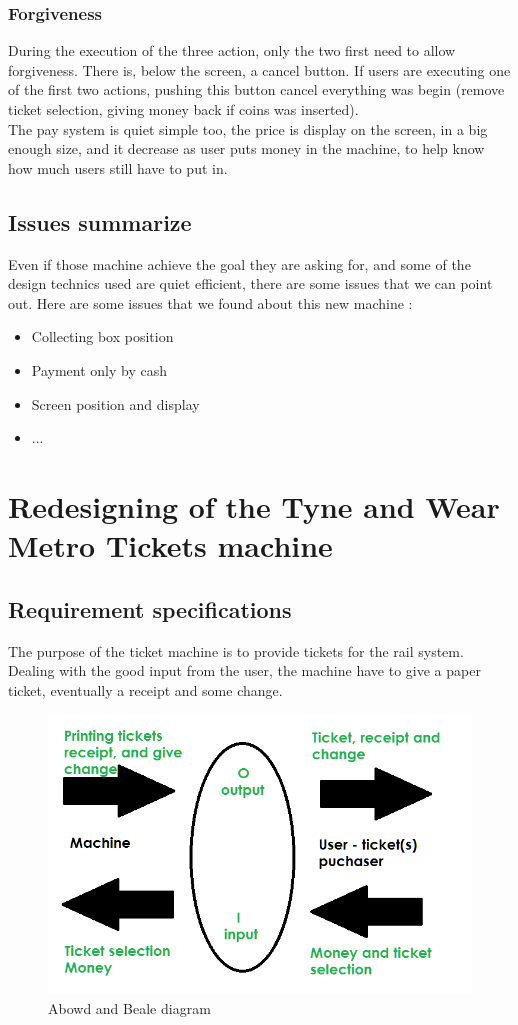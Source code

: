 \documentclass[a4paper,12pt]{article} %
\begin{document}
\subsubsection{Forgiveness}
During the execution of the three action, only the two first need to allow forgiveness. There is, below the screen, a cancel button. If users are executing one of the first two actions, pushing this button cancel everything was begin (remove ticket selection, giving money back if coins was inserted).
\\The pay system is quiet simple too, the price is display on the screen, in a big enough size, and it decrease as user puts money in the machine, to help know how much users still have to put in.

\subsection{Issues summarize}
Even if those machine achieve the goal they are asking for, and some of the design technics used are quiet efficient, there are some issues that we can point out.
Here are some issues that we found about this new machine : 
\begin{itemize}
\item Collecting box position
\item Payment only by cash
\item Screen position and display
\item ...
\end{itemize}

\section{Redesigning  of the Tyne and Wear Metro Tickets machine}
\subsection{Requirement specifications}
The purpose of the ticket machine is to provide tickets for the rail system. Dealing with the good input from the user, the machine have to give a paper ticket, eventually a receipt and some change.\begin{figure}[h!]
\center\includegraphics[width=0.75\linewidth]{diagramm.png}
\caption{\label{diagramm}Abowd and Beale diagram}
\end{figure}
\end{document}
